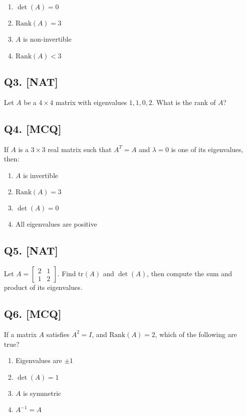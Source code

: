 \begin{enumerate}[label=(\alph*)]
    \item $\det(A) = 0$ 
    \item $\text{Rank}(A) = 3$
    \item $A$ is non-invertible 
    \item $\text{Rank}(A) < 3$
\end{enumerate}

\subsection*{Q3. [NAT]}
Let $A$ be a $4 \times 4$ matrix with eigenvalues $1, 1, 0, 2$. What is the rank of $A$?

\subsection*{Q4. [MCQ]}
If $A$ is a $3 \times 3$ real matrix such that $A^T = A$ and $\lambda = 0$ is one of its eigenvalues, then:

\begin{enumerate}[label=(\alph*)]
    \item $A$ is invertible
    \item $\text{Rank}(A) = 3$
    \item $\det(A) = 0$
    \item All eigenvalues are positive
\end{enumerate}

\subsection*{Q5. [NAT]}
Let $A = \begin{bmatrix} 2 & 1 \\ 1 & 2 \end{bmatrix}$. Find $\text{tr}(A)$ and $\det(A)$, then compute the sum and product of its eigenvalues.

\newpage
\subsection*{Q6. [MCQ]}
If a matrix $A$ satisfies $A^2 = I$, and $\text{Rank}(A) = 2$, which of the following are true?

\begin{enumerate}[label=(\alph*)]
    \item Eigenvalues are $\pm 1$
    \item $\det(A) = 1$
    \item $A$ is symmetric
    \item $A^{-1} = A$
\end{enumerate}

